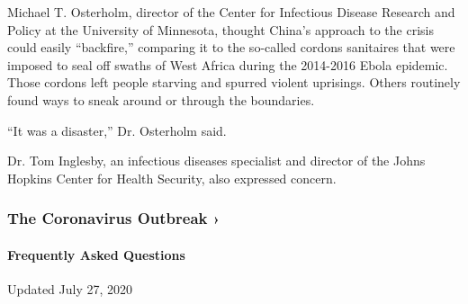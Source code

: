 Michael T. Osterholm, director of the Center for Infectious Disease
Research and Policy at the University of Minnesota, thought China's
approach to the crisis could easily ``backfire,'' comparing it to the
so-called cordons sanitaires that were imposed to seal off swaths of
West Africa during the 2014-2016 Ebola epidemic. Those cordons left
people starving and spurred violent uprisings. Others routinely found
ways to sneak around or through the boundaries.

``It was a disaster,'' Dr. Osterholm said.

Dr. Tom Inglesby, an infectious diseases specialist and director of the
Johns Hopkins Center for Health Security, also expressed concern.

\href{https://www.nytimes.com/news-event/coronavirus?action=click\&pgtype=Article\&state=default\&region=MAIN_CONTENT_3\&context=storylines_faq}{}

\hypertarget{the-coronavirus-outbreak-}{%
\subsubsection{The Coronavirus Outbreak
›}\label{the-coronavirus-outbreak-}}

\hypertarget{frequently-asked-questions}{%
\paragraph{Frequently Asked
Questions}\label{frequently-asked-questions}}

Updated July 27, 2020

